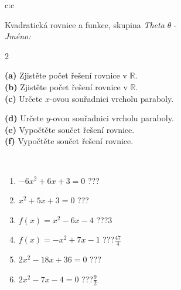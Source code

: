 \documentclass[10pt]{report}
\begin{document}
\begin{tabular}{c:c}
\begin{minipage}[c][104.5mm][t]{0.5\linewidth}
\begin{center}
\vspace{7mm}
{\huge \LARGE Kvadratická rovnice a funkce, skupina \textit{Theta $\theta$} -}\\[5mm]
\textit{Jméno:}\phantom{xxxxxxxxxxxxxxxxxxxxxxxxxxxxxxxxxxxxxxxxxxxxxxxxxxxxxxxxxxxxxxxxx}\\[5mm]
\begin{minipage}{0.95\linewidth}
\begin{center}
{\small \begin{multicols}{2} \raggedright
\textbf{(a)} Zjistěte počet řešení rovnice v \(\mathbb{R}\). \\[1mm]
\textbf{(b)} Zjistěte počet řešení rovnice v \(\mathbb{R}\). \\[1mm]
\textbf{(c)} Určete \(x\)-ovou souřadnici vrcholu paraboly. \par \columnbreak
\textbf{(d)} Určete \(y\)-ovou souřadnici vrcholu paraboly. \\[1mm]
\textbf{(e)} Vypočtěte součet řešení rovnice. \\[1mm]
\textbf{(f)} Vypočtěte součet řešení rovnice.
\end{multicols}
}
\end{center}
\end{minipage}
\\[4mm]
\begin{minipage}{0.79\linewidth}
\begin{center}
\begin{varwidth}{\linewidth}
\begin{enumerate}
\Large
\item $-6x^2+6x+3=0$\quad \dotfill\; ???\;\dotfill {}
\item $x^2+5x+3=0$\quad \dotfill\; ???\;\dotfill {}
\item $f(x)=x^2-6x-4$\quad \dotfill\; ???\;\dotfill \quad $3$
\item $f(x)=-x^2+7x-1$\quad \dotfill\; ???\;\dotfill \quad $\frac{47}{4}$
\item $2x^2-18x+36=0$\quad \dotfill\; ???\;\dotfill {}
\item $2x^2-7x-4=0$\quad \dotfill\; ???\;\dotfill \quad $\frac{9}{2}$
\end{enumerate}
\end{varwidth}
\end{center}
\end{minipage}

\end{center}
\end{minipage}
\end{tabular}
\end{document}
